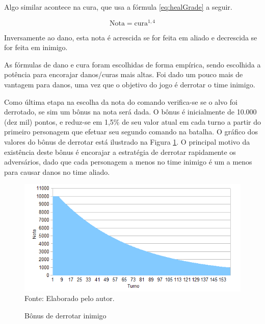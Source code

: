 \documentclass[
	12pt,					%
	openright,				%
	oneside,				%
	a4paper,				%
	bibjustif,				%
	chapter=TITLE,			%
	english,				%
	brazil,					%
	]{abntex2}
\newcommand{\source}[1]{\small Fonte: {#1}}
\begin{document}
	Algo similar acontece na cura,
	que usa a fórmula \eqref{eq:healGrade} a seguir.
	
	\begin{equation}
		\textrm{Nota} = \textrm{cura}^{1,4}
		\label{eq:healGrade}
	\end{equation}
	
	\vspace{3mm}
	
	Inversamente ao dano,
	esta nota é acrescida se for feita em aliado e decrescida se for feita em inimigo.
	
	As fórmulas de dano e cura foram escolhidas de forma empírica,
	sendo escolhida a potência para encorajar danos/curas mais altas.
	Foi dado um pouco mais de vantagem para danos,
	uma vez que o objetivo do jogo é derrotar o time inimigo.
	
	Como última etapa na escolha da nota do comando verifica-se se o alvo foi derrotado,
	se sim um bônus na nota será dada.
	O bônus é inicialmente de 10.000 (dez mil) pontos,
	e reduz-se em 1,5\% de seu valor atual em cada turno a partir do primeiro personagem que efetuar seu segundo comando na batalha.
	O gráfico dos valores do bônus de derrotar está ilustrado na Figura \ref{fig:defeatBonusGraph}.
	O principal motivo da existência deste bônus é encorajar a estratégia de derrotar rapidamente os adversários,
	dado que cada personagem a menos no time inimigo é um a menos para causar danos no time aliado.
	
	\begin{figure}[ht!]
		\centering
		\caption{Bônus de derrotar inimigo}
		\includegraphics[scale=0.8]{img/DefeatBonusGraph.png}\\
		\vspace{0.5mm}
		\source{Elaborado pelo autor.}
		\label{fig:defeatBonusGraph}
	\end{figure}
	
\end{document}
